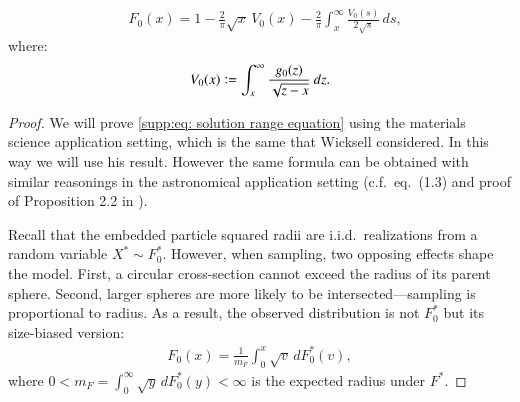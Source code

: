 \begin{lemma}\label{lemma: solution range equation}
    \begin{align}\label{supp:eq: solution range equation}
        &F_0(x) = 1 -\frac{2}{\pi} \sqrt{x} \, V_0(x) - \frac{2}{\pi} \int_{x}^{\infty} \frac{V_0(s)}{2 \sqrt{s}} \, ds,  
        \end{align}
    where:
    \begin{align}\label{supp:eq: V_0}
        V_0(x) \vcentcolon=\int_x^{\infty} \frac{g_0(z)}{\sqrt{z-x}} \: d z.
    \end{align}
\end{lemma}
\begin{proof}
    We will prove \eqref{supp:eq: solution range equation} using the materials science application setting, which is the same that Wicksell \cite{14} considered. In this way we will use his result. However the same formula can be obtained with similar reasonings in the astronomical application setting (c.f.\ eq.\ (1.3) and proof of Proposition 2.2 in \cite{19}).
    
    Recall that the embedded particle squared radii are i.i.d.\ realizations from a random variable $X^* \sim F^*_0$. However, when sampling, two opposing effects shape the model. First, a circular cross-section cannot exceed the radius of its parent sphere. Second, larger spheres are more likely to be intersected---sampling is proportional to radius. As a result, the observed distribution is not $F^*_0$ but its size-biased version:
    \begin{align}\label{supp:F as funct of F*}
        F_0(x)=\frac{1}{m_F} \int_0^x \sqrt{v} \, d F_0^*(v),
    \end{align}
    where $0<m_F=\int_0^{\infty} \sqrt{y} \, d F^*_0(y)<\infty$ is the expected radius under $F^*$.


\end{proof}

